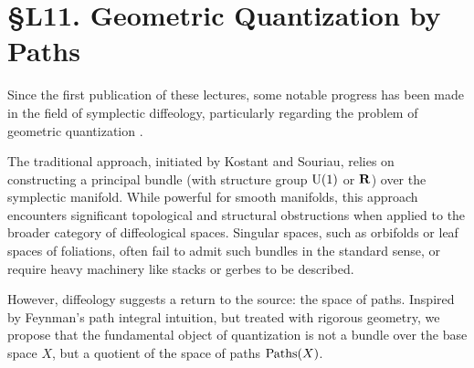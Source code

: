 
\chapter*{\S L11. Geometric Quantization by Paths}
\setcounter{footnote}{0}

\begin{abstract}
  In this lecture,
  we shall see a new approach to prequantization that has been developed since the first edition of this book.
  Moving away from the traditional construction of principal bundles over the space of motions,
  we construct the \emph{Prequantum Groupoid} directly from the space of paths.
  This construction applies to any connected parasymplectic diffeological space,
  including singular quotients and infinite-dimensional spaces.
  It reveals that the quantum phase is not an external addition,
  but an intrinsic geometric property of the path space itself.
\end{abstract}


Since the first publication of these lectures,
some notable progress has been made in the field of symplectic diffeology,
particularly regarding the problem of geometric quantization \cite{PIZ26a,PIZ26b}.

The traditional approach,
initiated by Kostant and Souriau,
relies on constructing a principal bundle (with structure group $\mathrm{U}(1)$ or $\mathbf{R}$) over the symplectic manifold.
While powerful for smooth manifolds,
this approach encounters significant topological and structural obstructions when applied to the broader category of diffeological spaces.
Singular spaces,
such as orbifolds or leaf spaces of foliations,
often fail to admit such bundles in the standard sense,
or require heavy machinery like stacks or gerbes to be described.

However,
diffeology suggests a return to the source:
the space of paths.
Inspired by Feynman's path integral intuition,
but treated with rigorous geometry,
we propose that the fundamental object of quantization is not a bundle over the base space $X$,
but a quotient of the space of paths $\operatorname{Paths}(X)$.

